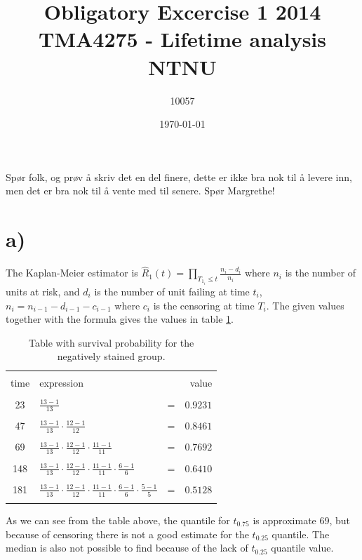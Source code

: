 \documentclass[10pt, a4paper]{article}
\begin{document}
\title{Obligatory Excercise 1 2014\\
\normalsize TMA4275 - Lifetime analysis\\
			NTNU}
\author{10057}
\date{\today}

\begin{titlepage}
\maketitle
\thispagestyle{empty}
\end{titlepage}

\setcounter{secnumdepth}{1}
Spør folk, og prøv å skriv det en del finere, dette er ikke bra nok til å levere inn, men det er bra nok til å vente med til senere. Spør Margrethe!
\section*{a)}
The Kaplan-Meier estimator is $ \hat{R}_1(t) = \prod \limits_{T_{1_i} \leq t} \frac{n_i-d_i}{n_i} $ where $ n_i $ is the number of units at risk, and $ d_i $ is the number of unit failing at time $t_i$, $ n_i = n_{i-1}-d_{i-1}-c_{i-1} $ where $ c_i $ is the censoring at time $T_i$.
The given values together with the formula gives the values in table \ref{r1hatt}.
\begin{center}
\begin{table}[h!]
\begin{tabular}{ c l c r }
& & & \\
time & expression & & value \\ & & \\
23 &  $ \frac{13-1}{13} $ & = & $ 0.9231 $\\ & & \\
47 &  $ \frac{13-1}{13}\cdot\frac{12-1}{12} $ & = & $ 0.8461 $\\ & & \\
69 &  $ \frac{13-1}{13}\cdot\frac{12-1}{12}\cdot\frac{11-1}{11} $ & = & $ 0.7692$ \\ & & \\
148 &  $ \frac{13-1}{13}\cdot\frac{12-1}{12}\cdot\frac{11-1}{11}\cdot\frac{6-1}{6} $ & = & $0.6410$ \\ & & \\
181 &  $ \frac{13-1}{13}\cdot\frac{12-1}{12}\cdot\frac{11-1}{11}\cdot\frac{6-1}{6}\cdot\frac{5-1}{5} $ & = & $ 0.5128 $\\
   & & \\

\end{tabular}
\caption{Table with survival probability for the negatively stained group.}
\label{r1hatt}
\end{table}
\end{center}
As we can see from the table above, the quantile for $t_{0.75}$ is approximate 69, but because of censoring there is not a good estimate for the $ t_{0.25}$ quantile. The median is also not possible to find because of the lack of $t_{0.25}$ quantile value.\\ 
\end{document}

